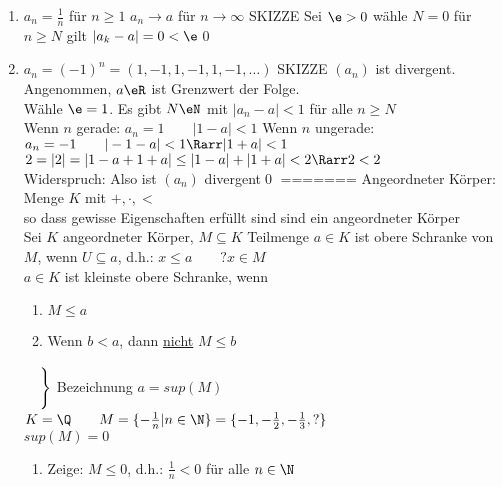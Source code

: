 \begin{enumerate}
\item{$a_n=\frac{1}{n}$ für $n\geq 1$
 $a_n→a$ für $n→∞$ SKIZZE %
\bew
Sei $\e>0$ wähle $N=0$ für $n\geq N$ gilt $|a_k-a|=0<\e$\qed}
\item{$a_n=(-1)^n=(1,-1,1,-1,1,-1,…)$ SKIZZE %
 $(a_n)$ ist divergent. 
\bew
Angenommen, $a\eR$ ist Grenzwert der Folge.\\
Wähle $\e=1$. Es gibt $N\eN$ mit $|a_n-a|<1$ für alle $n\geq N$\\
Wenn $n$ gerade: $a_n=1\qquad |1-a|<1$
Wenn $n$ ungerade: $a_n=-1\qquad |-1-a|<1 \Rarr |1+a|<1$\\
$2=|2|=|1-a+1+a|\leq |1-a|+|1+a|<2 \Rarr 2<2$\\
Widerspruch: Also ist $(a_n)$ divergent\qed}
=======
Angeordneter Körper:\\
Menge $K$ mit $+, ·, <$\\
so dass gewisse Eigenschaften erfüllt sind
\bsp
\Q{} sind ein angeordneter Körper\\
Sei $K$ angeordneter Körper, $M\subseteq K$ Teilmenge $a\in K$ ist obere Schranke von $M$, wenn $U\subseteq a$, d.h.: $x\leq a\qquad ?x\in M$\\
$a\in K$ ist kleinste obere Schranke, wenn\\
\begin{enumerate}
\item{$M\leq a$}
\item{Wenn $b < a$, dann \underline{nicht} $M\leq b$}
\end{enumerate}
\vspace*{-9.5ex}\hspace*{15.5em}
$\left.
\begin{array}{l}
{}\vspace*{2ex}\\{}
\end{array}
\right\}$
\vspace*{-5ex}Bezeichnung $a=sup(M)$
\vspace*{5ex}
%
\bsp
$K=\Q\qquad M=\{-\frac{1}{n}|n\in\N\}=\{-1,-\frac{1}{2},-\frac{1}{3},?\}$\\
$sup(M)=0$
\bew
\begin{enumerate}
\item {Zeige: $M \leq 0$, d.h.: $\frac{1}{n}<0$ für alle $n\in\N$\ok}

\end{enumerate}
\end{enumerate}

